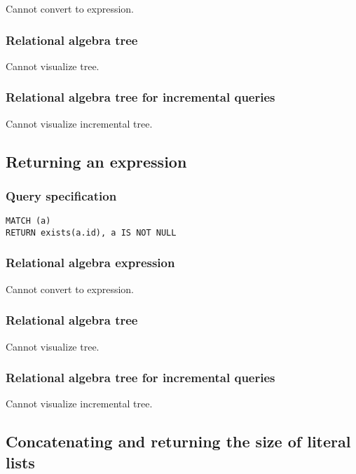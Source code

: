 Cannot convert to expression.

\subsubsection*{Relational algebra tree}

Cannot visualize tree.

\subsubsection*{Relational algebra tree for incremental queries}

Cannot visualize incremental tree.

\subsection{Returning an expression}

\subsubsection*{Query specification}

\begin{lstlisting}
MATCH (a)
RETURN exists(a.id), a IS NOT NULL
\end{lstlisting}

\subsubsection*{Relational algebra expression}

Cannot convert to expression.

\subsubsection*{Relational algebra tree}

Cannot visualize tree.

\subsubsection*{Relational algebra tree for incremental queries}

Cannot visualize incremental tree.

\subsection{Concatenating and returning the size of literal lists}

